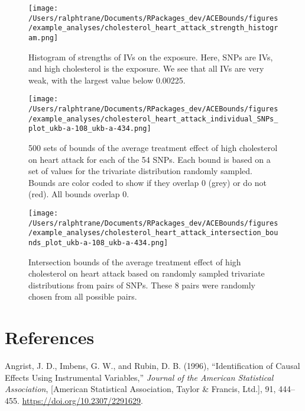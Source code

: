 \documentclass[
]{article}
\theoremstyle{plain}
\begin{document}
\begin{figure}[H]
 \center
 \texttt{[image: /Users/ralphtrane/Documents/RPackages\_dev/ACEBounds/figures/example\_analyses/cholesterol\_heart\_attack\_strength\_histogram.png]}
 \caption{Histogram of strengths of IVs on the exposure. Here, SNPs are IVs, and high cholesterol is the exposure. We see that all IVs are very weak, with the largest value below 0.00225.}
 \label{fig:cholesterol_heart_attack_strength_histogram}
\end{figure}

\begin{figure}[H]
  \center
  \texttt{[image: /Users/ralphtrane/Documents/RPackages\_dev/ACEBounds/figures/example\_analyses/cholesterol\_heart\_attack\_individual\_SNPs\_plot\_ukb-a-108\_ukb-a-434.png]}
    \caption{500 sets of bounds of the average treatment effect of high cholesterol on heart attack for each of the 54 SNPs. Each bound is based on a set of values for the trivariate distribution randomly sampled. Bounds are color coded to show if they overlap 0 (grey) or do not (red). All bounds overlap 0.}
    \label{fig:cholesterol_heart_attack_tri_bounds_all}
\end{figure}

\begin{figure}[H]
  \center
  \texttt{[image: /Users/ralphtrane/Documents/RPackages\_dev/ACEBounds/figures/example\_analyses/cholesterol\_heart\_attack\_intersection\_bounds\_plot\_ukb-a-108\_ukb-a-434.png]}
  \caption{Intersection bounds of the average treatment effect of high cholesterol on heart attack based on randomly sampled trivariate distributions from pairs of SNPs. These 8 pairs were randomly chosen from all possible pairs.}
  \label{fig:cholesterol_on_heart_attack_intersections}
\end{figure}

\hypertarget{references}{%
\section*{References}\label{references}}

\hypertarget{refs}{}
\leavevmode\hypertarget{ref-angrist_identification_1996}{}%
Angrist, J. D., Imbens, G. W., and Rubin, D. B. (1996), ``Identification of Causal Effects Using Instrumental Variables,'' \emph{Journal of the American Statistical Association}, {[}American Statistical Association, Taylor \& Francis, Ltd.{]}, 91, 444--455. \url{https://doi.org/10.2307/2291629}.
\end{document}
